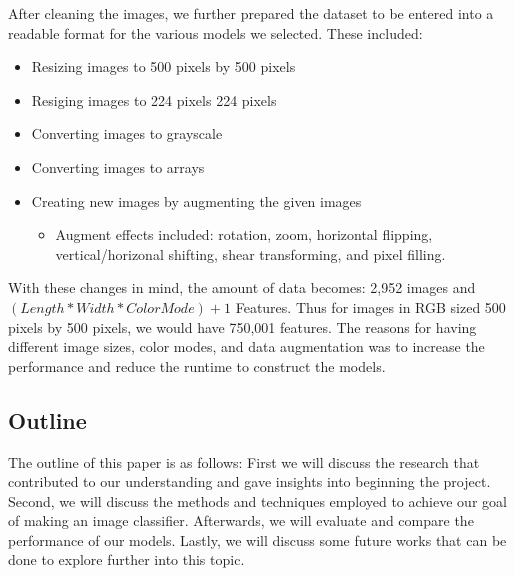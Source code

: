 After cleaning the images, we further prepared the dataset to be entered into a readable format for the various models we selected. These included:
\begin{itemize}
    \item Resizing images to 500 pixels by 500 pixels
    \item Resiging images to 224 pixels 224 pixels
    \item Converting images to grayscale
    \item Converting images to arrays
    \item Creating new images by augmenting the given images
    \begin{itemize} 
        \item Augment effects included: rotation, zoom, horizontal flipping, vertical/horizonal shifting, shear transforming, and pixel filling.
    \end{itemize}
\end{itemize}

With these changes in mind, the amount of data becomes: 2,952 images and $(Length * Width * Color Mode) + 1$ Features. 
Thus for images in RGB sized 500 pixels by 500 pixels, we would have 750,001 features.
The reasons for having different image sizes, color modes, and data augmentation was to increase the performance and reduce the runtime to construct the models.

\subsection{Outline}
The outline of this paper is as follows: First we will discuss the research that contributed to our understanding and gave insights into beginning the project.
Second, we will discuss the methods and techniques employed to achieve our goal of making an image classifier.
Afterwards, we will evaluate and compare the performance of our models.
Lastly, we will discuss some future works that can be done to explore further into this topic.
